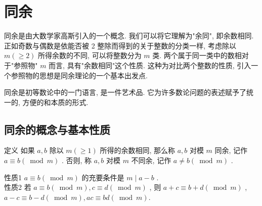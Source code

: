 \begin{comment}
	由于 $x=5^{m}>1$ , 可知上式右边两个式子中的数都大于 1 , 因此,  $A$ 为合数. \\
	当 $n$ 为奇数时, 设 $n=2 m+1, y=5^{m}, z=5 y^{2}$ , 则\begin{align}
		A & =1+z+z^{2}+z^{3}+z^{4}                                                                                              \\
		  & =\left(1+3 z+z^{2}\right)^{2}-5 z^{3}-10 z^{2}-5 z                                                                  \\
		  & =\left(1+3 z+z^{2}\right)^{2}-5 z(z+1)^{2}                                                                          \\
		  & =\left(1+5 y^{2}+25 y^{4}\right)^{2}-25 y^{2}\left(1+5 y^{2}\right)^{2}                                             \\
		  & =\left(1+5 y^{2}+25 y^{4}-5 y\left(1+5 y^{2}\right)\right)\left(1+5 y^{2}+25 y^{4}+5 y\left(1+5 y^{2}\right)\right)
	\end{align}

	当 $m>0$, 即 $y \geqslant 5$ 时, 上式右边两式都大于 1 ,此时, $A$ 为合数,当 $m=0$ 时, $A=1+5+5^{2}+5^{3}+5^{4}=781=11 \times 71$ 也是合数.

	所以, 对任意正整数 $n, A$ 为合数, 命题获证.

\newpage

\end{comment}

\section{同余}
	同余是由大数学家高斯引入的一个概念. 我们可以将它理解为"余同", 即余数相同. 正如奇数与偶数是依能否被 2 整除而得到的关于整数的分类一样, 考虑除以 $m(\geqslant 2)$ 所得余数的不同, 可以将整数分为 $m$ 类. 两个属于同一类中的数相对于"参照物" $m$ 而言, 具有"余数相同"这个性质. 这种为对比两个整数的性质, 引入一个参照物的思想是同余理论的一个基本出发点.

	同余是初等数论中的一门语言, 是一件艺术品. 它为许多数论问题的表述赋予了统一的, 方便的和本质的形式.
	\subsection{同余的概念与基本性质}
	定义 如果 $a ,  b$ 除以 $m(\geqslant 1)$ 所得的余数相同, 那么称 $a ,  b$ 对模 $m$ 同余, 记作 $a \equiv b(\bmod m)$ . 否则, 称 $a ,  b$ 对模 $m$ 不同余, 记作 $a \neq b(\bmod m)$ .

	性质1 $a \equiv b(\bmod m)$ 的充要条件是 $m \mid a-b$ . \\
	性质2 若 $a \equiv b(\bmod m), c \equiv d(\bmod m)$ , 则 $a+c \equiv b+d(\bmod m)$ ,  $a-c \equiv b-d(\bmod m), a c \equiv b d(\bmod m)$.

